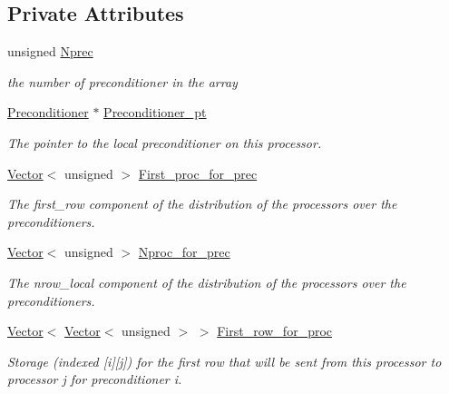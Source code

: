 \subsection*{Private Attributes}
\begin{DoxyCompactItemize}
\item 
unsigned \hyperlink{classoomph_1_1PreconditionerArray_ab4f9ea783d3db44cf8401a0e0acc46dd}{Nprec}
\begin{DoxyCompactList}\small\item\em the number of preconditioner in the array \end{DoxyCompactList}\item 
\hyperlink{classoomph_1_1Preconditioner}{Preconditioner} $\ast$ \hyperlink{classoomph_1_1PreconditionerArray_a963dad278f4abf1195666a4a050a0390}{Preconditioner\+\_\+pt}
\begin{DoxyCompactList}\small\item\em The pointer to the local preconditioner on this processor. \end{DoxyCompactList}\item 
\hyperlink{classoomph_1_1Vector}{Vector}$<$ unsigned $>$ \hyperlink{classoomph_1_1PreconditionerArray_a44c35e1fafae4b68e28d95b7d76e73b5}{First\+\_\+proc\+\_\+for\+\_\+prec}
\begin{DoxyCompactList}\small\item\em The first\+\_\+row component of the distribution of the processors over the preconditioners. \end{DoxyCompactList}\item 
\hyperlink{classoomph_1_1Vector}{Vector}$<$ unsigned $>$ \hyperlink{classoomph_1_1PreconditionerArray_accd34d22e7859ca172624b3882127e30}{Nproc\+\_\+for\+\_\+prec}
\begin{DoxyCompactList}\small\item\em The nrow\+\_\+local component of the distribution of the processors over the preconditioners. \end{DoxyCompactList}\item 
\hyperlink{classoomph_1_1Vector}{Vector}$<$ \hyperlink{classoomph_1_1Vector}{Vector}$<$ unsigned $>$ $>$ \hyperlink{classoomph_1_1PreconditionerArray_a64fe716df64c78b9d4c74212f5da314a}{First\+\_\+row\+\_\+for\+\_\+proc}
\begin{DoxyCompactList}\small\item\em Storage (indexed \mbox{[}i\mbox{]}\mbox{[}j\mbox{]}) for the first row that will be sent from this processor to processor j for preconditioner i. \end{DoxyCompactList}\item 

\end{DoxyCompactItemize}
